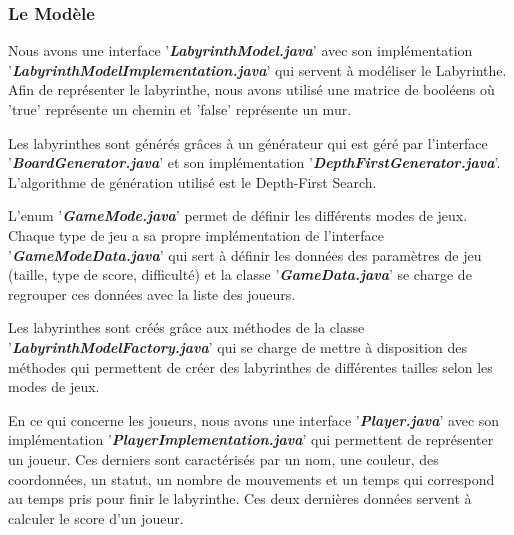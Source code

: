 \subsubsection{Le Modèle}
\label{subsubsec:modele}

Nous avons une interface '\textbf{\textit{LabyrinthModel.java}}' avec son implémentation
'\textbf{\textit{LabyrinthModelImplementation.java}}' qui servent à modéliser le Labyrinthe.
Afin de représenter le labyrinthe, nous avons utilisé une matrice de booléens
où 'true' représente un chemin et 'false' représente un mur.

Les labyrinthes sont générés grâces à un générateur qui est géré par
l'interface '\textbf{\textit{BoardGenerator.java}}' et son implémentation '\textbf{\textit{DepthFirstGenerator.java}}'.
L'algorithme de génération utilisé est le Depth-First Search.

L'enum '\textbf{\textit{GameMode.java}}' permet de définir les différents modes de jeux.
Chaque type de jeu a sa propre implémentation de l'interface '\textbf{\textit{GameModeData.java}}'
qui sert à définir les données des paramètres de jeu
(taille, type de score, difficulté) et la classe '\textbf{\textit{GameData.java}}' se charge de
regrouper ces données avec la liste des joueurs.

Les labyrinthes sont créés grâce aux méthodes de la classe
'\textbf{\textit{LabyrinthModelFactory.java}}' qui se charge de mettre à disposition des méthodes
qui permettent de créer des labyrinthes de différentes tailles selon les modes
de jeux.

En ce qui concerne les joueurs, nous avons une interface '\textbf{\textit{Player.java}}' avec son
implémentation '\textbf{\textit{PlayerImplementation.java}}' qui permettent de représenter un
joueur. Ces derniers sont caractérisés par un nom, une couleur, des coordonnées, un
statut, un nombre de mouvements et un temps qui correspond au temps pris pour finir le labyrinthe.
Ces deux dernières données servent à calculer le score d'un joueur.

